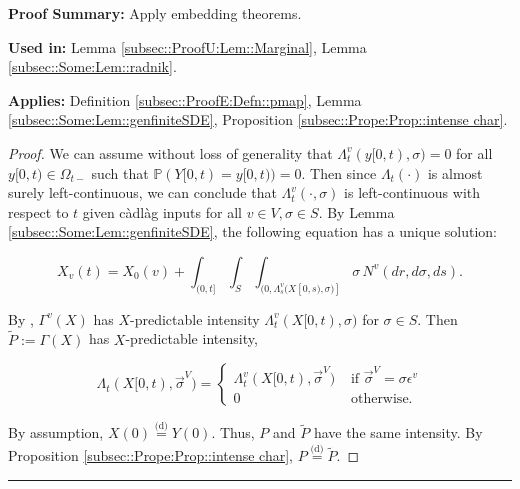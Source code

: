 \documentclass[12pt]{article}
\newcommand{\mb}{\mathbb}
\newcommand{\te}{\text}
\newcommand{\ep}{\epsilon}
\newcommand{\pfsum}{\textbf{Proof Summary: }}
\newcommand{\usein}{\textbf{Used in: }}
\newcommand{\app}{\textbf{Applies: }}
\newcommand{\lin}{\rule{\linewidth}{0.4 pt}}
\newcommand{\pr}{\mb{P}}							%
\newcommand{\deq}{\overset{\text{(d)}}{=}}			%
\newcommand{\defeq}{:=}								%
\renewcommand{\v}{v}							%
\renewcommand{\S}{S}							%
\newcommand{\s}{\sigma}							%
\newcommand{\sv}{\vec{\s}}						%
\newcommand{\ev}{\ep}							%
\renewcommand{\t}{t}							%
\newcommand{\sset}{\Omega}						%
\renewcommand{\tt}{s}							%
\newcommand{\X}{X}								%
\newcommand{\vind}[1]{^{#1}}					%
\newcommand{\vsi}[1]{^{#1}}						%
\newcommand{\cind}[1]{_{#1}}					%
\newcommand{\tp}[1]{(#1)}						%
\newcommand{\tip}[1]{#1}						%
\newcommand{\ts}[1]{_{#1}}						%
\newcommand{\poiss}{N}							%
\renewcommand{\r}{r}							%
\newcommand{\alt}[1]{\widetilde{#1}}			%
\newcommand{\XX}{Y}								%
\newcommand{\pmap}{\Gamma}						%
\newcommand{\rp}{P}								%
\newcommand{\ratee}{\Lambda}					%
\newcommand{\xx}{y}								%
\begin{document}
\pfsum Apply embedding theorems.

\usein Lemma \ref{subsec::ProofU:Lem::Marginal}, Lemma \ref{subsec::Some:Lem::radnik}.

\app Definition \ref{subsec::ProofE:Defn::pmap}, Lemma \ref{subsec::Some:Lem::genfiniteSDE}, Proposition \ref{subsec::Prope:Prop::intense char}.

\begin{proof}

We can assume without loss of generality that \(\ratee\ts{\t}\vind{\v}(\xx\tip{[0,\t)},\s) = 0\) for all \(\xx\tip{[0,\t)}\in \sset\ts{\t-}\) such that \(\pr(\XX\tip{[0,\t)} = \xx\tip{[0,\t)}) = 0\). Then since \(\ratee\ts{\t}(\cdot)\) is almost surely left-continuous, we can conclude that \(\ratee\ts{\t}\vind{\v}(\cdot,\s)\) is left-continuous with respect to \(\t\) given c\`adl\`ag inputs for all \(\v\in V,\s\in\S\). By Lemma \ref{subsec::Some:Lem::genfiniteSDE}, the following equation has a unique solution:

\[\X\cind{\v}\tp{\t} = \X\cind{0}\tp{\v} + \int_{(0,\t]}\int_\S\int_{(0,\ratee\ts{\tt}\vind{\v}(\X\tip{[0,\tt)},\s)]}  \s\,\poiss\vind{\v}(d\r,d\s,d\tt).\]

By \cite[Exercise 14.7.1]{DalVer08}, \(\pmap\vind{\v}(\X)\) has \(\X\)-predictable intensity \(\ratee\ts{\t}\vind{\v}(\X\tip{[0,\t)},\s)\) for \(\s \in \S\). Then \(\alt{\rp} \defeq \pmap(\X)\) has \(\X\)-predictable intensity,

\[\ratee\ts{\t}(\X\tip{[0,\t)},\sv\vsi{V}) = \begin{cases}
\ratee\ts{\t}\vind{\v}(\X\tip{[0,\t)},\sv\vsi{V}) &\te{ if } \sv\vsi{V} = \s\ev\vind{\v}\\
0&\te{ otherwise.}
\end{cases}\]

By assumption, \(\X\tp{0} \deq \XX\tp{0}\). Thus, \(\rp\) and \(\alt{\rp}\) have the same intensity. By Proposition \ref{subsec::Prope:Prop::intense char}, \(\rp \deq \alt{\rp}\).
\end{proof}
\lin
\end{document}
